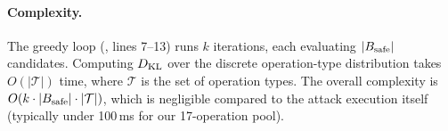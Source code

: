 \paragraph{Complexity.}
The greedy loop (, lines 7--13) runs $k$ iterations,
each evaluating $|B_{\text{safe}}|$ candidates. Computing $D_{\text{KL}}$ over the
discrete operation-type distribution takes $O(|\mathcal{T}|)$ time, where
$\mathcal{T}$ is the set of operation types. The overall complexity is
$O(k \cdot |B_{\text{safe}}| \cdot |\mathcal{T}|)$, which is negligible compared
to the attack execution itself (typically under 100\,ms for our
17-operation pool).
